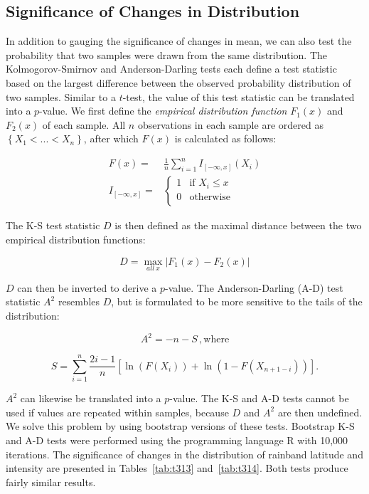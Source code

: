 \documentclass{ametsoc}
\begin{document}
\subsection{Significance of Changes in Distribution}

In addition to gauging the significance of changes in mean, we can also test the probability that two samples were drawn from the same distribution. The Kolmogorov-Smirnov and Anderson-Darling tests each define a test statistic based on the largest difference between the observed probability distribution of two samples. Similar to a $t$-test, the value of this test statistic can be translated into a $p$-value. We first define the \textit{empirical distribution function} $F_1(x)$ and $F_2(x)$ of each sample. All $n$ observations in each sample are ordered as $\left\{X_1 < ... < X_n\right\}$, after which $F(x)$ is calculated as follows:

\begin{align}
	F(x) =& \frac{1}{n}\sum_{i=1}^n I_{[-\infty,x]} (X_i) \\
	I_{[-\infty,x]} =& 
	\begin{cases}
   		 1 & \text{if } X_i \leq x\\
    		0 & \text{otherwise} \\
    	\end{cases}
\end{align}

 The K-S test statistic $D$ is then defined as the maximal distance between the two empirical distribution functions:

\begin{equation}
	D=\max_{all\ x} |F_{1}(x)-F_{2}(x)|
\end{equation}

$D$ can then be inverted to derive a $p$-value. The Anderson-Darling (A-D) test statistic $A^2$ resembles $D$, but is formulated to be more sensitive to the tails of the distribution:

\begin{equation}
	A^2 = -n-S \,,
	\mathrm{where}
\end{equation}

\begin{equation}
	S=\sum_{i=1}^n \frac{2i-1}{n}\left[\ln(F(X_i)) + \ln\left(1-F(X_{n+1-i})\right)\right].
\end{equation}

$A^2$ can likewise be translated into a $p$-value. The K-S and A-D tests cannot be used if values are repeated within samples, because $D$ and $A^2$ are then undefined. We solve this problem by using bootstrap versions of these tests. Bootstrap K-S and A-D tests were performed using the programming language R with 10,000 iterations. The significance of changes in the distribution of rainband latitude and intensity are presented in Tables~\ref{tab:t313} and~\ref{tab:t314}. Both tests produce fairly similar results.
\end{document}
